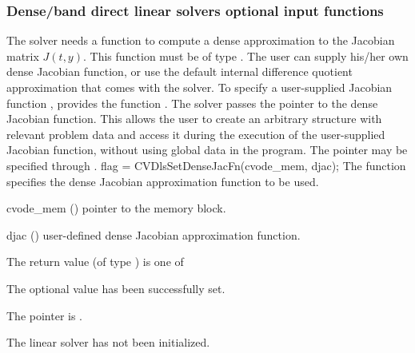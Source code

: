 \subsubsection{Dense/band direct linear solvers optional input functions}
\label{sss:optin_dls}
The 
{\cvdense} solver needs a function to compute a dense approximation to
the Jacobian matrix $J(t,y)$.  This function must be of type . 
The user can supply his/her own dense Jacobian function, or use the default 
internal difference quotient approximation
that comes with the {\cvdense} solver.
To specify a user-supplied Jacobian function , {\cvdense} provides 
the function .
The {\cvdense} solver passes the pointer  
to the dense Jacobian function. This allows the user to
create an arbitrary structure with relevant problem data and access it
during the execution of the user-supplied Jacobian function, without
using global data in the program.  
The pointer  may be specified through .
{
  flag = CVDlsSetDenseJacFn(cvode\_mem, djac);
}
{
  The function  specifies the dense Jacobian
  approximation function to be used.
}
{
  \begin{args}
  \item[cvode\_mem] ()
    pointer to the {\cvodes} memory block.
  \item[djac] ()
    user-defined dense Jacobian approximation function.
  \end{args}
}
{
  The return value  (of type ) is one of
  \begin{args}
  \item[\Id{CVDLS\_SUCCESS}] 
    The optional value has been successfully set.
  \item[\Id{CVDLS\_MEM\_NULL}]
    The  pointer is .
  \item[\Id{CVDLS\_LMEM\_NULL}]
    The {\cvdense} linear solver has not been initialized.
  \end{args}
}
